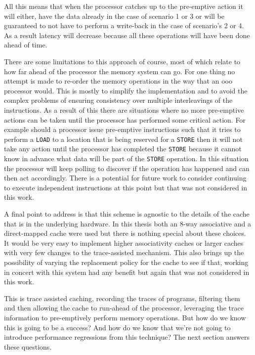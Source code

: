 
All this means that when the processor catches up to the pre-emptive action it will either, have the data already in the case of scenario 1 or 3 or will be guaranteed to not have to perform a write-back in the case of scenario's 2 or 4. As a result latency will decrease because all these operations will have been done ahead of time. 

There are some limitations to this approach of course, most of which relate to how far ahead of the processor the memory system can go. For one thing no attempt is made to re-order the memory operations in the way that an \gls{ooo} processor would. This is mostly to simplify the implementation and to avoid the complex problems of ensuring consistency over multiple interleavings of the instructions. As a result of this there are situations where no more pre-emptive actions can be taken until the processor has performed some critical action. For example should a processor issue pre-emptive instructions such that it tries to perform a \texttt{LOAD} to a location that is being reserved for a \texttt{STORE} then it will not take any action until the processor has completed the \texttt{STORE} because it cannot know in advance what data will be part of the \texttt{STORE} operation. In this situation the processor will keep polling to discover if the operation has happened and can then act accordingly. There is a potential for future work to consider continuing to execute independent instructions at this point but that was not considered in this work. 


A final point to address is that this scheme is agnostic to the details of the cache that is in the underlying hardware. In this thesis both an 8-way associative and a direct-mapped cache were used but there is nothing special about these choices. It would be very easy to implement higher associativity caches or larger caches with very few changes to the trace-assisted mechanism. This also brings up the possibility of varying the replacement policy for the cache to see if that, working in concert with this system had any benefit but again that was not considered in this work. 

This is trace assisted caching, recording the traces of programs, filtering them and then allowing the cache to run-ahead of the processor, leveraging the trace information to pre-emptively perform memory operations. But how do we know this is going to be a success? And how do we know that we're not going to introduce performance regressions from this technique? The next section answers these questions.

